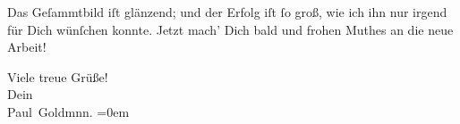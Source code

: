 \pstart
           Das Geſammtbild iſt glänzend; und der Erfolg iſt{ }ſo groß, wie ich ihn nur irgend für
               Dich wünſchen konnte. Jetzt mach’ Dich bald und frohen Muthes an die neue Arbeit!\pend
           
\pstart
           Viele treue Grüße! {\\[\baselineskip]}Dein {\\[\baselineskip]}\spacefill\mbox{Paul Goldmnn.}\pend
           \leftskip=0em{}\endnumbering{}  \newcommand{\dateiname}{L02756}\newcommand{\titel}{Paul Goldmann an Arthur Schnitzler, 17. 10. [1895]}\newcommand{\editorInnen}{Martin Anton Müller und Laura Untner}
